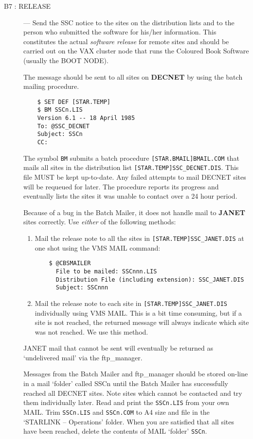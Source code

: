 \begin{description}
\item [B7 : RELEASE] ---
Send the SSC notice to the sites on the distribution lists and to the person
who submitted the software for his/her information.
This constitutes the actual {\em software release} for remote sites and should
be carried out on the VAX cluster node that runs the Coloured Book Software
(usually the BOOT NODE).

The message should be sent to all sites on {\bf DECNET} by using the
batch mailing procedure.

\begin{verbatim}
    $ SET DEF [STAR.TEMP]
    $ BM SSCn.LIS
    Version 6.1 -- 18 April 1985
    To: @SSC_DECNET
    Subject: SSCn
    CC:
\end{verbatim}
The symbol {\tt BM} submits a batch procedure {\tt [STAR.BMAIL]BMAIL.COM}
that mails all sites in the distribution list {\tt [STAR.TEMP]SSC\_DECNET.DIS}.
This file MUST be kept up-to-date.
Any failed attempts to mail DECNET sites will be requeued for later.
The procedure reports its progress and eventually lists the sites it was
unable to contact over a 24 hour period.

Because of a bug in the Batch Mailer, it does not handle mail to {\bf JANET}
sites correctly. Use {\em either} of the following methods:

\begin{enumerate}
\item Mail the release note to all the sites in {\tt [STAR.TEMP]SSC\_JANET.DIS}
at one shot using the VMS MAIL command:
\begin{verbatim}
    $ @CBSMAILER
      File to be mailed: SSCnnn.LIS
      Distribution File (including extension): SSC_JANET.DIS
      Subject: SSCnnn
\end{verbatim}
\item Mail the release note to each site in {\tt [STAR.TEMP]SSC\_JANET.DIS}
individually using VMS MAIL.
This is a bit time consuming, but if a site is not reached, the returned
message will always indicate which site was not reached.
We use this method.
\end{enumerate}

JANET mail that cannot be sent will eventually be returned as `undelivered
mail' via the ftp\_manager.

Messages from the Batch Mailer and ftp\_manager should be stored on-line in a
mail `folder' called SSCn until the Batch Mailer has successfully reached all
DECNET sites. Note sites which cannot be contacted and try them individually
later. Read and print the {\tt SSCn.LIS} from your own MAIL.
Trim {\tt SSCn.LIS} and {\tt SSCn.COM} to A4 size and file in the
`STARLINK -- Operations' folder. When you are satisfied that all sites have been
reached, delete the contents of MAIL `folder' {\tt SSCn}.


\end{description}
